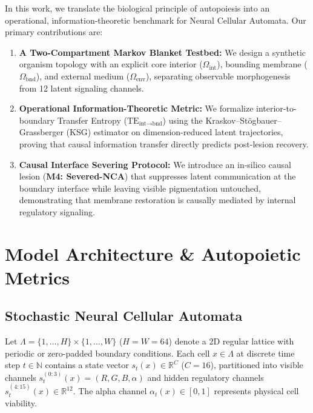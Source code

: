 \documentclass[10pt,twocolumn]{article}
\begin{document}
In this work, we translate the biological principle of autopoiesis into an operational, information-theoretic benchmark for Neural Cellular Automata. Our primary contributions are:
\begin{enumerate}\setlength{\itemsep}{1pt}\setlength{\parskip}{0pt}
    \item \textbf{A Two-Compartment Markov Blanket Testbed:} We design a synthetic organism topology with an explicit core interior ($\Omega_{\text{int}}$), bounding membrane ($\Omega_{\text{bnd}}$), and external medium ($\Omega_{\text{env}}$), separating observable morphogenesis from 12 latent signaling channels.
    \item \textbf{Operational Information-Theoretic Metric:} We formalize interior-to-boundary Transfer Entropy ($\text{TE}_{\text{int}\to\text{bnd}}$) using the Kraskov--St\"ogbauer--Grassberger (KSG) estimator on dimension-reduced latent trajectories, proving that causal information transfer directly predicts post-lesion recovery.
    \item \textbf{Causal Interface Severing Protocol:} We introduce an in-silico causal lesion (\textbf{M4: Severed-NCA}) that suppresses latent communication at the boundary interface while leaving visible pigmentation untouched, demonstrating that membrane restoration is causally mediated by internal regulatory signaling.
\end{enumerate}

\section{Model Architecture \& Autopoietic Metrics}


\subsection{Stochastic Neural Cellular Automata}

Let $\Lambda = \{1, \dots, H\} \times \{1, \dots, W\}$ ($H = W = 64$) denote a 2D regular lattice with periodic or zero-padded boundary conditions. Each cell $x \in \Lambda$ at discrete time step $t \in \mathbb{N}$ contains a state vector $s_t(x) \in \mathbb{R}^C$ ($C = 16$), partitioned into visible channels $s_t^{(0:3)}(x) = (R, G, B, \alpha)$ and hidden regulatory channels $s_t^{(4:15)}(x) \in \mathbb{R}^{12}$. The alpha channel $\alpha_t(x) \in [0, 1]$ represents physical cell viability.
\end{document}
